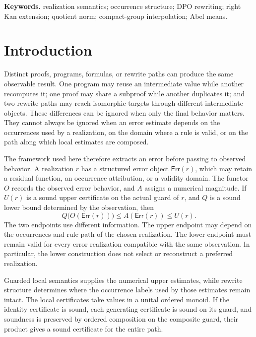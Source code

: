 \documentclass[12pt,a4paper,twoside]{extarticle}
\theoremstyle{compactplain}
\theoremstyle{compactdef}
\newcommand{\Err}{\mathsf{Err}}
\begin{document}
\noindent\textbf{Keywords.}
realization semantics; occurrence structure; DPO rewriting; right Kan extension;
quotient norm; compact-group interpolation; Abel means.

\section{Introduction}\label{sec:introduction}

Distinct proofs, programs, formulas, or rewrite paths can produce the same
observable result.  One program may reuse an intermediate value while another
recomputes it; one proof may share a subproof while another duplicates it; and
two rewrite paths may reach isomorphic targets through different intermediate
objects.  These differences can be ignored when only the final behavior
matters.  They cannot always be ignored when an error estimate depends on the
occurrences used by a realization, on the domain where a rule is valid, or on
the path along which local estimates are composed.

The framework used here therefore extracts an error before passing to observed
behavior.  A realization \(r\) has a structured error object \(\Err(r)\), which
may retain a residual function, an occurrence attribution, or a validity
domain.  The functor \(O\) records the observed error behavior, and \(A\)
assigns a numerical magnitude.  If \(U(r)\) is a sound upper certificate on
the actual guard of \(r\), and \(Q\) is a sound lower bound determined by the
observation, then
\[
  Q\bigl(O(\Err(r))\bigr)
  \leq A(\Err(r))
  \leq U(r).
\]
The two endpoints use different information.  The upper endpoint may depend
on the occurrences and rule path of the chosen realization.  The lower
endpoint must remain valid for every error realization compatible with the
same observation.  In particular, the lower construction does not select or
reconstruct a preferred realization.

Guarded local semantics supplies the numerical upper estimates, while rewrite
structure determines where the occurrence labels used by those estimates
remain intact.  The local certificates take values in a unital ordered monoid.
If the identity certificate is sound, each generating certificate is sound on
its guard, and soundness is preserved by ordered composition on the composite
guard, their product gives a sound certificate for the entire path.
\end{document}
